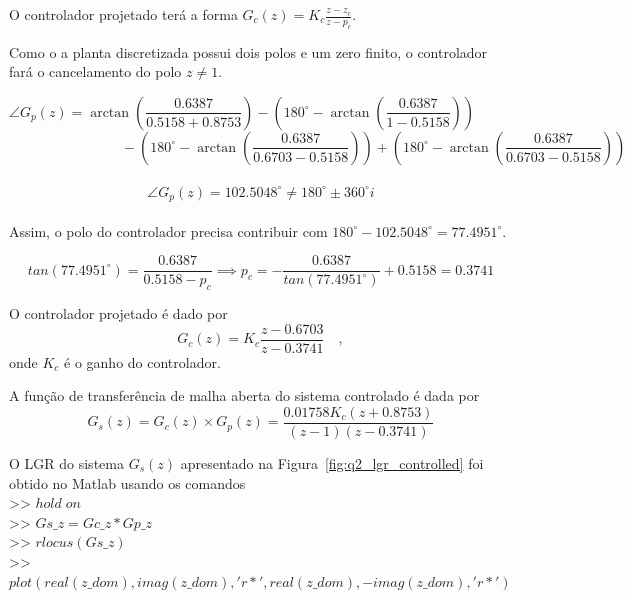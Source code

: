 \documentclass{article}
\begin{document}
        {O controlador projetado terá a forma $G_c(z) = K_c\frac{z - z_c}{z - p_c}$.

        {Como o a planta discretizada possui dois polos e um zero finito, o
            controlador fará o cancelamento do polo $z \neq 1$.}

        \[ \angle G_p(z) = \arctan\left( \frac{0.6387}{ 0.5158 + 0.8753 } \right)
                - \left(180^\circ - \arctan\left( \frac{0.6387}{ 1 - 0.5158 } \right) \right) \qquad\qquad\]
        \[\qquad\qquad\qquad\qquad - \left(180^\circ - \arctan\left( \frac{0.6387}{ 0.6703 - 0.5158 } \right) \right)
                + \left(180^\circ - \arctan\left( \frac{0.6387}{ 0.6703 - 0.5158 } \right) \right) \]\\
        \[ \angle G_p(z) = 102.5048^\circ \neq 180^\circ \pm 360^\circ i \]\\

        {Assim, o polo do controlador precisa contribuir com
        $180^\circ - 102.5048^\circ = 77.4951^\circ$.}

        \[ tan(77.4951^\circ) = \frac{0.6387}{ 0.5158 - p_c}
            \implies p_c = -\frac{0.6387}{tan(77.4951^\circ)} + 0.5158 = 0.3741 \]

        {O controlador projetado é dado por}
        \[ G_c(z) = K_c\frac{z - 0.6703}{z - 0.3741} \quad , \]
        {onde $K_c$ é o ganho do controlador.}

        {A função de transferência de malha aberta do sistema controlado é dada por}
        \[ G_s(z) = G_c(z) \times G_p(z) = \frac{0.01758K_c(z+0.8753)}{(z-1)(z-0.3741)} \]

        {O LGR do sistema $G_s(z)$ apresentado na Figura~\ref{fig:q2_lgr_controlled}
            foi obtido no Matlab usando os comandos\\
        >> $ hold \; on $\\
        >> $ Gs\_z = Gc\_z * Gp\_z $\\
        >> $ rlocus(Gs\_z) $\\
        >> $ plot(real(z\_dom),imag(z\_dom),'r*',real(z\_dom),-imag(z\_dom),'r*') $ }\\

}
\end{document}
